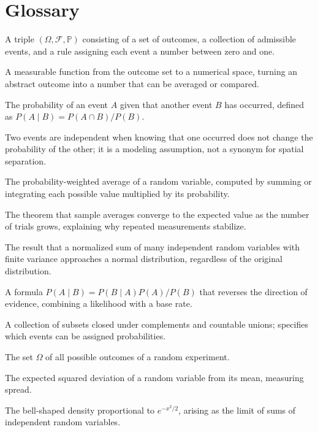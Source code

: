 \section*{Glossary}
\begin{description}[leftmargin=*,style=nextline,itemsep=0.3em]
\item[\textbf{Probability space.}] A triple $(\Omega,\mathcal{F},\mathbb{P})$ consisting of a set of outcomes, a collection of admissible events, and a rule assigning each event a number between zero and one.
\item[\textbf{Random variable.}] A measurable function from the outcome set to a numerical space, turning an abstract outcome into a number that can be averaged or compared.
\item[\textbf{Conditional probability.}] The probability of an event $A$ given that another event $B$ has occurred, defined as $P(A\mid B)=P(A\cap B)/P(B)$.
\item[\textbf{Independence.}] Two events are independent when knowing that one occurred does not change the probability of the other; it is a modeling assumption, not a synonym for spatial separation.
\item[\textbf{Expectation.}] The probability-weighted average of a random variable, computed by summing or integrating each possible value multiplied by its probability.
\item[\textbf{Law of large numbers.}] The theorem that sample averages converge to the expected value as the number of trials grows, explaining why repeated measurements stabilize.
\item[\textbf{Central limit theorem.}] The result that a normalized sum of many independent random variables with finite variance approaches a normal distribution, regardless of the original distribution.
\item[\textbf{Bayes' rule.}] A formula $P(A\mid B)=P(B\mid A)P(A)/P(B)$ that reverses the direction of evidence, combining a likelihood with a base rate.
\item[$\sigma$-\textbf{algebra.}] A collection of subsets closed under complements and countable unions; specifies which events can be assigned probabilities.
\item[\textbf{Sample space.}] The set $\Omega$ of all possible outcomes of a random experiment.
\item[\textbf{Variance.}] The expected squared deviation of a random variable from its mean, measuring spread.
\item[\textbf{Normal distribution.}] The bell-shaped density proportional to $e^{-x^2/2}$, arising as the limit of sums of independent random variables.
\end{description}
